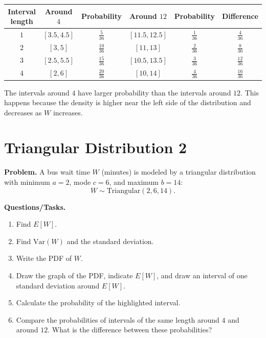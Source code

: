 \begin{enumerate}[label=\textbf{\alph*)}]
	
	\begin{center}
		\begin{tabular}{c c c c c c}
			\hline
			Interval length & Around \(4\) & Probability & Around \(12\) & Probability & Difference \\
			\hline
			\(1\) & \([3.5,4.5]\) & \(\frac{5}{36}\) & \([11.5,12.5]\) & \(\frac{1}{36}\) & \(\frac{4}{36}\) \\
			\(2\) & \([3,5]\) & \(\frac{10}{36}\) & \([11,13]\) & \(\frac{2}{36}\) & \(\frac{8}{36}\) \\
			\(3\) & \([2.5,5.5]\) & \(\frac{15}{36}\) & \([10.5,13.5]\) & \(\frac{3}{36}\) & \(\frac{12}{36}\) \\
			\(4\) & \([2,6]\) & \(\frac{20}{36}\) & \([10,14]\) & \(\frac{4}{36}\) & \(\frac{16}{36}\) \\
			\hline
		\end{tabular}
	\end{center}
	
	The intervals around \(4\) have larger probability than the intervals around \(12\). This happens because the density is higher near the left side of the distribution and decreases as \(W\) increases.
	
\end{enumerate}

\section{Triangular Distribution 2}

\textbf{Problem.}
A bus wait time \(W\) (minutes) is modeled by a triangular distribution with minimum \(a=2\), mode \(c=6\), and maximum \(b=14\):
\[
W\sim \text{Triangular}(2,6,14).
\]

\textbf{Questions/Tasks.}
\begin{enumerate}[label=\textbf{\alph*)}]
	\item Find \(E[W]\).
	\item Find \(\mathrm{Var}(W)\) and the standard deviation.
	\item Write the PDF of \(W\).
	\item Draw the graph of the PDF, indicate \(E[W]\), and draw an interval of one standard deviation around \(E[W]\).
	\item Calculate the probability of the highlighted interval.
	\item Compare the probabilities of intervals of the same length around \(4\) and around \(12\). What is the difference between these probabilities?
\end{enumerate}

